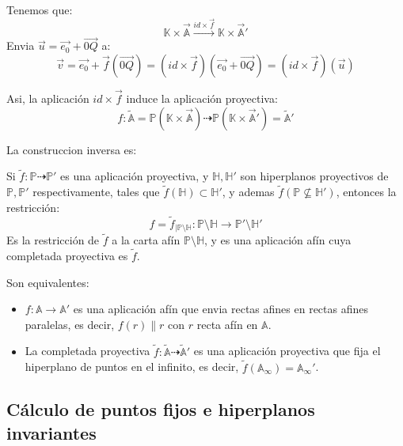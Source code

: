Tenemos que:
\[
\mathbb{K} \times \vec{\mathbb{A}} \overset{id \times \vec{f}}{\longrightarrow} \mathbb{K} \times \vec{\mathbb{A}}'
\]
Envia $\vec{u} = \vec{e_0} + \vec{0Q}$ a:
\[
\vec{v} =
\vec{e_0} + \vec{f}(\vec{0Q}) =
(id \times \vec{f})(\vec{e_0} + \vec{0Q}) =
(id \times \vec{f})(\vec{u})
\]

Asi, la aplicación $id \times \vec{f}$ induce la aplicación proyectiva:
\[
f : \widetilde{\mathbb{A}} = \mathbb{P}(\mathbb{K} \times \vec{\mathbb{A}}) \dashrightarrow \mathbb{P}(\mathbb{K} \times \vec{\mathbb{A}}') = \widetilde{\mathbb{A}}'
\]

La construccion inversa es:

\begin{proposición}
    Si $\widetilde{f} : \mathbb{P} \dashrightarrow \mathbb{P}'$ es una aplicación proyectiva, y $\mathbb{H}, \mathbb{H}'$ son hiperplanos proyectivos de $\mathbb{P}, \mathbb{P}'$ respectivamente, tales que $\widetilde{f}(\mathbb{H}) \subset \mathbb{H}'$, y ademas $\widetilde{f}(\mathbb{P} \nsubseteq \mathbb{H}')$, entonces la restricción:
    \[
    f = \widetilde{f}_{|\mathbb{P} \setminus \mathbb{H}} : \mathbb{P} \setminus \mathbb{H} \to \mathbb{P}' \setminus \mathbb{H}'
    \]
    Es la restricción de $\widetilde{f}$ a la carta afín $\mathbb{P} \setminus \mathbb{H}$, y es una aplicación afín cuya completada proyectiva es $\widetilde{f}$.
\end{proposición}

\begin{proposición}
    Son equivalentes:
    \begin{itemize}
        \item $f: \mathbb{A} \to \mathbb{A}'$ es una aplicación afín que envia rectas afines en rectas afines paralelas, es decir, $f(r) \parallel r$ con $r$ recta afín en $\mathbb{A}$.
        \item La completada proyectiva $\widetilde{f} : \widetilde{\mathbb{A}} \dashrightarrow \widetilde{\mathbb{A}}'$ es una aplicación proyectiva que fija el hiperplano de puntos en el infinito, es decir, $\widetilde{f}(\mathbb{A}_{\infty}) = \mathbb{A}_{\infty}'$.
    \end{itemize}
\end{proposición}


\subsection{Cálculo de puntos fijos e hiperplanos invariantes}

